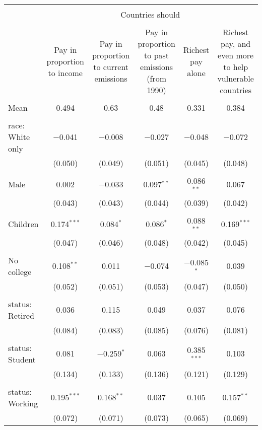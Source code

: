 
\begin{tabular}{@{\extracolsep{5pt}}lccccc} 
\\[-1.8ex]\hline 
\hline \\[-1.8ex] 
 & \multicolumn{5}{c}{Countries should} \\ 
\cline{2-6} 
\\[-1.8ex] & Pay in proportion to income & Pay in proportion to current emissions & Pay in proportion to past emissions (from 1990) & Richest pay alone & Richest pay, and even more to help vulnerable countries \\ 
\hline \\[-1.8ex] 
 Mean & 0.494 & 0.63 & 0.48 & 0.331 & 0.384  \\ \hline \\[-1.8ex] race: White only & $-$0.041 & $-$0.008 & $-$0.027 & $-$0.048 & $-$0.072 \\ 
  & (0.050) & (0.049) & (0.051) & (0.045) & (0.048) \\ 
  & & & & & \\ 
 Male & 0.002 & $-$0.033 & 0.097$^{**}$ & 0.086$^{**}$ & 0.067 \\ 
  & (0.043) & (0.043) & (0.044) & (0.039) & (0.042) \\ 
  & & & & & \\ 
 Children & 0.174$^{***}$ & 0.084$^{*}$ & 0.086$^{*}$ & 0.088$^{**}$ & 0.169$^{***}$ \\ 
  & (0.047) & (0.046) & (0.048) & (0.042) & (0.045) \\ 
  & & & & & \\ 
 No college & 0.108$^{**}$ & 0.011 & $-$0.074 & $-$0.085$^{*}$ & 0.039 \\ 
  & (0.052) & (0.051) & (0.053) & (0.047) & (0.050) \\ 
  & & & & & \\ 
 status: Retired & 0.036 & 0.115 & 0.049 & 0.037 & 0.076 \\ 
  & (0.084) & (0.083) & (0.085) & (0.076) & (0.081) \\ 
  & & & & & \\ 
 status: Student & 0.081 & $-$0.259$^{*}$ & 0.063 & 0.385$^{***}$ & 0.103 \\ 
  & (0.134) & (0.133) & (0.136) & (0.121) & (0.129) \\ 
  & & & & & \\ 
 status: Working & 0.195$^{***}$ & 0.168$^{**}$ & 0.037 & 0.105 & 0.157$^{**}$ \\ 
  & (0.072) & (0.071) & (0.073) & (0.065) & (0.069) \\ 

\end{tabular}
